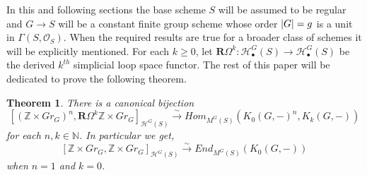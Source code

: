 \documentclass[11pt,twoside]{amsart}
\newtheorem{theorem}{Theorem}[section]
\theoremstyle{definition}
\theoremstyle{remark}
\numberwithin{equation}{section}
\newcommand{\mc}{\mathcal}
\newcommand{\ZZ}{\mathbb{Z}}
\newcommand{\iso}{\xrightarrow{\sim}}
\begin{document}
In this and following sections the base scheme $S$ will be assumed to be regular and $G\to S$ will be a constant finite group scheme whose order $|G|=\textsl{g}$ is a unit in $\Gamma(S,\mathcal{O}_S)$. When the required results are true for a broader class of schemes it will be explicitly mentioned. For each $k\geq 0$, let $\mathbf{R}\Omega^k:\mc{H}_\bullet^G(S)\to \mc{H}_\bullet^G(S)$ be the derived $k^{th}$ simplicial loop space functor. The rest of this paper will be dedicated to prove the following theorem.
	\begin{theorem}\label{thm:main}
		 There is a canonical bijection
		\[ [(\ZZ\times Gr_G)^n,\mathbf{R}\Omega^k \ZZ\times Gr_G]_{\mc{H}^G(S)}\iso Hom_{M^G(S)}(K_0(G,-)^n,K_k(G,-))  \]
		for each $n,k\in\mathbb{N}$. In particular we get,
		\[ [\ZZ\times Gr_G,\ZZ\times Gr_G]_{\mc{H}^G(S)}\iso End_{M^G(S)}(K_0(G,-)) \]
		when $n=1$ and $k=0$.
	\end{theorem}
\end{document}
